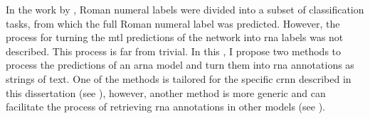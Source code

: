 
In the work by \textcite{chen2018functional}, Roman numeral
labels were divided into a subset of classification tasks,
from which the full Roman numeral label was predicted.
However, the process for turning the \gls{mtl} predictions
of the network into \gls{rna} labels was not described. This
process is far from trivial. In this \thesisdiss{}, I
propose two methods to process the predictions of an
\gls{arna} model and turn them into \gls{rna} annotations as
strings of text. One of the methods is tailored for the
specific \gls{crnn} described in this dissertation (see
), however, another method is more
generic and can facilitate the process of retrieving
\gls{rna} annotations in other models (see
).
